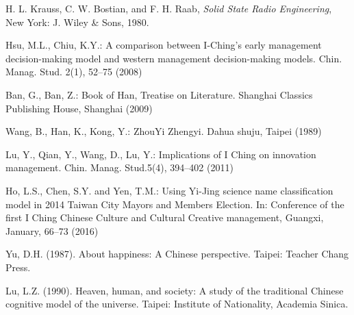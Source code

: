 \documentclass[conference]{IEEEtran}
\begin{document}

%
%
%
\begin{thebibliography}{1}


%

H. L. Krauss, C. W. Bostian, and F. H. Raab, \emph{Solid State Radio Engineering}, New York: J. Wiley \& Sons, 1980.

 Hsu, M.L., Chiu, K.Y.: A comparison between I-Ching’s early management decision-making model and western management decision-making models. Chin. Manag. Stud. 2(1), 52–75 (2008)

 Ban, G., Ban, Z.: Book of Han, Treatise on Literature. Shanghai Classics Publishing House, Shanghai (2009)

 Wang, B., Han, K., Kong, Y.: ZhouYi Zhengyi. Dahua shuju, Taipei (1989)

 Lu, Y., Qian, Y., Wang, D., Lu, Y.: Implications of I Ching on innovation management. Chin. Manag. Stud.5(4), 394–402 (2011)

 Ho, L.S., Chen, S.Y. and Yen, T.M.: Using Yi-Jing science name classification model in 2014 Taiwan City
Mayors and Members Election. In: Conference of the first I Ching Chinese Culture and Cultural Creative
management, Guangxi, January, 66–73 (2016)

 Yu, D.H. (1987). About happiness: A Chinese perspective. Taipei: Teacher Chang Press.

 Lu, L.Z. (1990). Heaven, human, and society: A study of the traditional Chinese cognitive model
of the universe. Taipei: Institute of Nationality, Academia Sinica.


\end{thebibliography}
\end{document}
